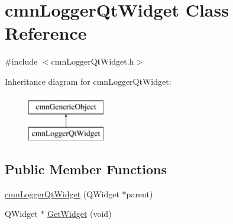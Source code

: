 \hypertarget{classcmn_logger_qt_widget}{}\section{cmn\+Logger\+Qt\+Widget Class Reference}
\label{classcmn_logger_qt_widget}


{\ttfamily \#include $<$cmn\+Logger\+Qt\+Widget.\+h$>$}

Inheritance diagram for cmn\+Logger\+Qt\+Widget\+:\begin{figure}[H]
\begin{center}
\leavevmode
\includegraphics[height=2.000000cm]{dd/de1/classcmn_logger_qt_widget}
\end{center}
\end{figure}
\subsection*{Public Member Functions}
\begin{DoxyCompactItemize}
\item 
\hyperlink{classcmn_logger_qt_widget_a9fff93827e24bb98b8de352f98f330dc}{cmn\+Logger\+Qt\+Widget} (Q\+Widget $\ast$parent)
\item 
Q\+Widget $\ast$ \hyperlink{classcmn_logger_qt_widget_a5ca75a6b622392e42b2cfc7244e4e816}{Get\+Widget} (void)
\end{DoxyCompactItemize}
